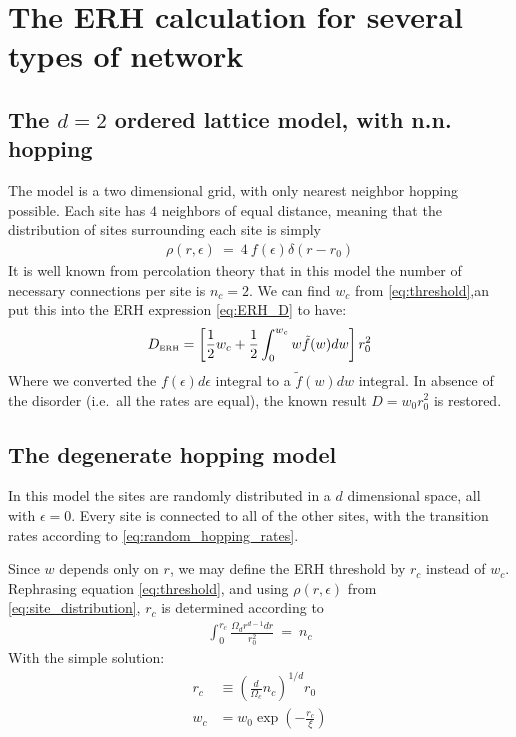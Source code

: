 \section{The ERH calculation for several types of network}
\subsection{The $d=2$ ordered lattice model, with n.n. hopping}

The model is a  two dimensional grid, with only nearest neighbor hopping possible. 
Each site has $4$ neighbors of equal distance, meaning that
the distribution of sites surrounding each site is simply
%
\begin{align}
\rho(r,\epsilon) \ = \ 4\ f(\epsilon)\delta(r-r_0) 
\end{align}
%
It is well known from percolation theory \cite{stauffer_introduction_1994}
that in this model the number of necessary connections per site is $n_c=2$. We can
find $w_c$ from \ref{eq:threshold},an put this into the ERH 
expression \ref{eq:ERH_D} to have:
%
\begin{align}
D_{\mbox{\tiny ERH}} =  \left[\frac{1}{2}w_c + \frac{1}{2}\int_0^{w_c} w\tilde{f}(w) dw\right]r_0^2
\end{align}
%
Where we converted the $f(\epsilon)d\epsilon$ integral to a $\tilde{f}(w)dw$
integral. In absence of the disorder (i.e.\ all the rates are equal),
the known result $D = w_0r_0^2$ is restored.


\subsection{The degenerate hopping model}

In this model the sites are randomly distributed in a $d$ dimensional 
space, all with $\epsilon=0$. Every site is connected to all of the other
sites, with the transition rates according to \ref{eq:random_hopping_rates}.

Since $w$ depends only on $r$, we may define the ERH threshold by
$r_c$ instead of $w_c$. Rephrasing equation \ref{eq:threshold}, and 
using $\rho(r,\epsilon)$ from \ref{eq:site_distribution}, $r_c$ is determined according to
%
\begin{align}
\int_0^{r_c} \frac{\Omega_d r^{d-1} dr}{r_0^2} \ = \  n_c 
\end{align}
%
With the simple solution:
%
\begin{align}
r_c  &\equiv \left(\frac{d}{\Omega_c}n_c\right)^{1/d}  r_0 \\
w_c &= w_0\exp\left(-\frac{r_c}{\xi}\right) 
\end{align}
%

